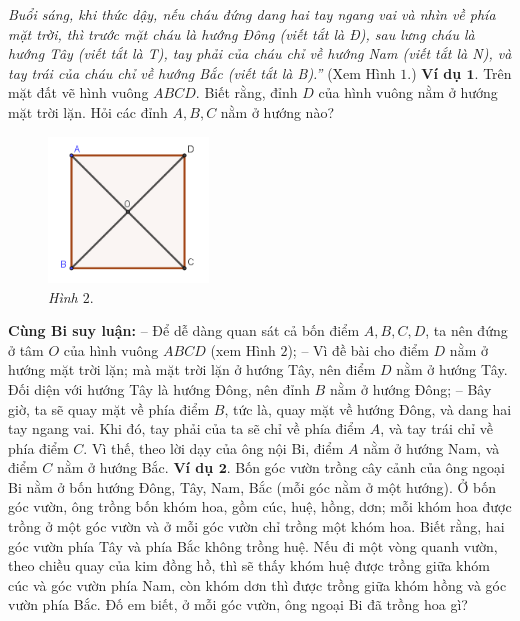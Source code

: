 	\textit{Buổi sáng, khi thức dậy, nếu cháu đứng dang hai tay ngang vai và nhìn về phía mặt trời, thì trước mặt cháu là hướng Đông (viết tắt là \textnormal{Đ}), sau lưng cháu là hướng Tây (viết tắt là \textnormal{T}), tay phải của cháu chỉ về hướng Nam (viết tắt là \textnormal{N}), và tay trái của cháu chỉ về hướng Bắc (viết tắt là \textnormal{B}).”} (Xem Hình $1$.)
	\vskip 0.1cm
	\textbf{\color{toancuabi}Ví dụ $\pmb1.$} Trên mặt đất vẽ hình vuông $ABCD$. Biết rằng, đỉnh $D$ của hình vuông nằm ở hướng mặt trời lặn. Hỏi các đỉnh $A, B, C$ nằm ở  hướng nào?
	\vskip 0.1cm
	\begin{figure}
		\centering
		\captionsetup{labelformat= empty, justification=centering}
		\includegraphics[width=0.38\textwidth]{pic2}
		\caption{\small\textit{Hình $2.$}}
		\vspace*{-15pt}
	\end{figure}
	\textbf{\color{toancuabi}Cùng Bi suy luận:}
	\vskip 0.1cm
	-- Để dễ dàng quan sát cả bốn điểm $A, B, C, D$, ta nên đứng ở tâm $O$ của hình vuông $ABCD$ (xem Hình $2$);
	\vskip 0.1cm
	-- Vì đề bài cho điểm $D$ nằm ở hướng mặt trời lặn; mà mặt trời lặn ở hướng Tây, nên điểm $D$ nằm ở hướng Tây. Đối diện với hướng Tây là hướng Đông, nên đỉnh $B$ nằm ở hướng Đông;
	\vskip 0.1cm
	-- Bây giờ, ta sẽ quay mặt về phía điểm $B$, tức là, quay mặt về hướng Đông, và dang hai tay ngang vai. Khi đó, tay phải của ta sẽ chỉ về phía điểm $A$, và tay trái chỉ về phía điểm $C$. Vì thế, theo lời dạy của ông nội Bi, điểm $A$ nằm ở hướng Nam, và điểm $C$ nằm ở hướng Bắc.
	\vskip 0.1cm
	\textbf{\color{toancuabi}Ví dụ $\pmb2.$} Bốn góc vườn trồng cây cảnh của ông ngoại Bi nằm ở bốn hướng Đông, Tây, Nam, Bắc (mỗi góc nằm ở một hướng). Ở bốn góc vườn, ông trồng bốn khóm hoa, gồm cúc, huệ, hồng, dơn; mỗi khóm hoa được trồng ở một góc vườn và ở mỗi góc vườn chỉ trồng một khóm hoa. Biết rằng, hai góc vườn phía Tây và phía Bắc không trồng huệ. Nếu đi một vòng quanh vườn, theo chiều quay của kim đồng hồ, thì sẽ thấy khóm huệ được trồng giữa khóm cúc và góc vườn phía Nam, còn khóm dơn thì được trồng giữa khóm hồng và góc vườn phía Bắc. Đố em biết, ở mỗi góc vườn, ông ngoại Bi đã trồng hoa gì?
